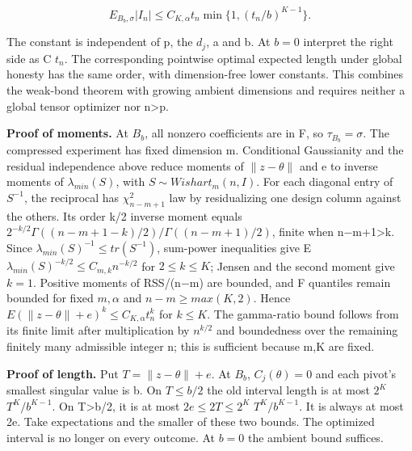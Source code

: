 \documentclass[
  11pt,
]{article}
\begin{document}
\[
 E_{B_b,\sigma}|I_n|\le C_{K,\alpha}
 t_n\min\{1,(t_n/b)^{K-1}\}. \tag{C3}
\]

The constant is independent of p, the \(d_j\), a and b. At \(b=0\)
interpret the right side as C \(t_n\). The corresponding pointwise
optimal expected length under global honesty has the same order, with
dimension-free lower constants. This combines the weak-bond theorem with
growing ambient dimensions and requires neither a global tensor
optimizer nor n\textgreater p.

\textbf{Proof of moments.} At \(B_b\), all nonzero coefficients are in
F, so \(\tau _{B_b}=\sigma\). The compressed experiment has fixed
dimension m. Conditional Gaussianity and the residual independence above
reduce moments of \(\|z-\theta \|\) and e to inverse moments of
\(\lambda _{min}(S)\), with \(S\sim Wishart_m(n,I)\). For each diagonal
entry of \(S^{-1}\), the reciprocal has \(\chi ^{2}_{n-m+1}\) law by
residualizing one design column against the others. Its order k/2
inverse moment equals \(2^{-k/2}Γ((n-m+1-k)/2)/Γ((n-m+1)/2)\), finite
when n−m+1\textgreater k. Since
\(\lambda _{min}(S)^{-1}\le tr(S^{-1})\), sum-power inequalities give E
\(\lambda _{min}(S)^{-k/2}\le C_{m,k}n^{-k/2}\) for \(2\le k\le K\);
Jensen and the second moment give \(k=1\). Positive moments of RSS/(n−m)
are bounded, and F quantiles remain bounded for fixed \(m,\alpha\) and
\(n-m\ge max(K,2)\). Hence
\(E(\|z-\theta \|+e)^k\le C_{K,\alpha }t_n^k\) for \(k\le K\). The
gamma-ratio bound follows from its finite limit after multiplication by
\(n^{k/2}\) and boundedness over the remaining finitely many admissible
integer n; this is sufficient because m,K are fixed.

\textbf{Proof of length.} Put \(T=\|z-\theta \|+e\). At \(B_b\),
\(C_j(\theta )=0\) and each pivot's smallest singular value is b. On
\(T\le b/2\) the old interval length is at most \(2^K\) \(T^K/b^{K-1}\).
On T\textgreater b/2, it is at most \(2e\le 2T\le 2^K\) \(T^K/b^{K-1}\).
It is always at most 2e. Take expectations and the smaller of these two
bounds. The optimized interval is no longer on every outcome. At \(b=0\)
the ambient bound suffices.
\end{document}
